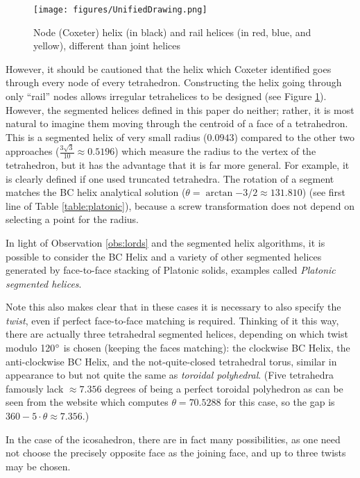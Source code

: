 \documentclass[11pt]{article}
\begin{document}
{\begin{figure}
     \centering
     \texttt{[image: figures/UnifiedDrawing.png]}
     \caption{Node (Coxeter) helix (in black) and rail helices (in red, blue, and yellow),
       different than joint helices}
  \label{fig:helixnodes}
\end{figure}

However, it should be cautioned that the helix which Coxeter identified\cite{coxeter1985simplicial}
goes through every node of every tetrahedron. Constructing the helix going
through only ``rail'' nodes allows irregular tetrahelices to be designed\cite{read2018transforming}
(see Figure \ref{fig:helixnodes}).
However, the segmented helices defined in this paper do neither; rather, it is most natural to
imagine them moving through the centroid of a face of a tetrahedron.
This is a segmented helix of
very small radius ($0.0943$) compared to the other two approaches
($\frac{3\sqrt{3}}{10} \approx 0.5196$) which measure the radius to the
vertex of the tetrahedron, but it has
the advantage that it is far more general. For example, it is
clearly defined if one used truncated tetrahedra.
The rotation of a
segment matches the BC helix analytical solution
($\theta = \arctan{-3/2} \approx 131.810$) (see first line of Table \ref{table:platonic}),
because a screw transformation does not depend on selecting a point for the radius.

In light of Observation \ref{obs:lords} and the segmented helix algorithms, it is possible to
consider the BC Helix and a variety of other segmented helices generated by
face-to-face stacking of Platonic solids, examples called {\em Platonic segmented helices}.

Note this also makes clear that in these cases it is necessary to also specify the {\em twist},
even if perfect face-to-face matching is required.
Thinking of it this
way, there are actually three tetrahedral segmented helices,
depending on which twist modulo 120$\degree$
is chosen (keeping the faces matching): the clockwise BC Helix, the anti-clockwise BC Helix, and the
not-quite-closed tetrahedral torus, similar in appearance to but not quite the same as
{\em toroidal polyhedral}\cite{wiki:toroidalpolyhedra}.
(Five tetrahedra famously lack $\approx 7.356$ degrees of being a perfect toroidal polyhedron
as can be seen from the website which computes $\theta = 70.5288$ for this case,
so the gap is $360 - 5 \cdot \theta \approx 7.356$.)

In the case of the icosahedron, there are in fact many possibilities,
as one need not choose the precisely opposite face as the joining face, and
up to three twists may be chosen.


}
\end{document}
